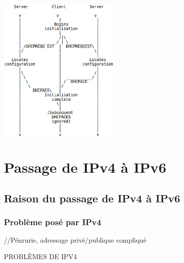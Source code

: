\documentclass[twoside,openright,a4paper,11pt,french]{article}
\begin{document}
\includegraphics[width=6cm]{./pics/timeline_dhcp_reuse_add.eps}


\section{Passage de IPv4 à IPv6}
\subsection{Raison du passage de IPv4 à IPv6}
\subsubsection{Problème posé par IPv4}
//Pénrurie, adressage privé/publique compliqué

PROBLÈMES DE IPV4
\end{document}
